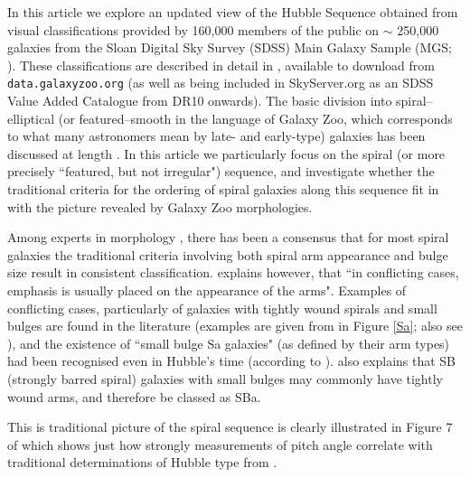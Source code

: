\documentclass[usenatbib]{mn2e}
\begin{document}
 In this article we explore an updated view of the Hubble Sequence obtained from visual classifications provided by 160,000 members of the public on $\sim$ 250,000 galaxies from the Sloan Digital Sky Survey (SDSS) Main Galaxy Sample (MGS; \citealt{Strauss2002}). These classifications are described in detail in \citep{Willett2013}, available to download from {\tt data.galaxyzoo.org} (as well as being included in SkyServer.org as an SDSS Value Added Catalogue from DR10 \citep{DR10} onwards). The basic division into spiral--elliptical (or featured--smooth in the language of Galaxy Zoo, which corresponds to what many astronomers mean by late- and early-type) galaxies has been discussed at length \citep[e.g.][]{Willett2013}. In this article we particularly focus on the spiral (or more precisely ``featured, but not irregular") sequence, and investigate whether the traditional criteria for the ordering of spiral galaxies along this sequence fit in with the picture revealed by Galaxy Zoo morphologies. 

Among experts in morphology \citep[e.g.][]{Sandage2005,Buta2013}, there has been a consensus that for most spiral galaxies the traditional criteria involving both spiral arm appearance and bulge size result in consistent classification. \citet{Buta2013} explains however, that ``in conflicting cases, emphasis is usually placed on the appearance of the arms". Examples of conflicting cases, particularly of galaxies with tightly wound spirals and small bulges are found in the literature (examples are given from \citealt{Hogg1993} in Figure \ref{Sa}; also see \citealt{Sandage1961, SandageBedke1994, Jore1996}), and the existence of ``small bulge Sa galaxies" (as defined by their arm types) had been recognised even in Hubble's time (according to \citealt{Sandage2005}). \citet{Buta2013} also explains that SB (strongly barred spiral) galaxies with small bulges may commonly have tightly wound arms, and therefore be classed as SBa. 

This is traditional picture of the spiral sequence is clearly illustrated in Figure 7 of \citet{kennicutt1981} which shows just how strongly measurements of pitch angle correlate with traditional determinations of Hubble type from \citet{sandagetammann1981}. 
\end{document}
